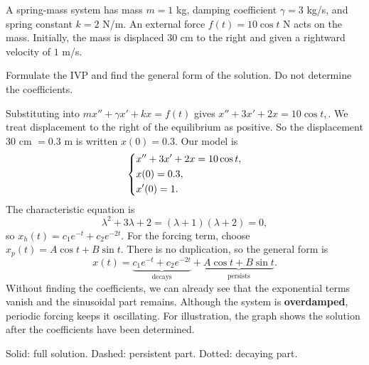 \documentclass[10pt,letterpaper]{article}
\begin{document}
\begin{example}[1]{
A spring-mass system has mass $m=1$ kg, damping coefficient
$\gamma=3$ kg/s, and spring constant $k=2$ N/m.
An external force $f(t)=10\cos t$ N acts on the mass.
Initially, the mass is displaced $30$ cm to the right
and given a rightward velocity of $1$ m/s.

Formulate the IVP and find the general form of the solution.
Do not determine the coefficients.
}
Substituting into $mx''+\gamma x'+kx=f(t)$ gives $x''+3x'+2x=10\cos t,$. We treat displacement to the right of the equilibrium as positive. So the displacement $30$ cm $= 0.3$ m is written $x(0)=0.3$. Our model is
\[
\begin{dcases}
x''+3x'+2x=10\cos t,\\
x(0)=0.3,\\
x'(0)=1.
\end{dcases}
\]
The characteristic equation is
\[
\lambda^2+3\lambda+2=(\lambda+1)(\lambda+2)=0,
\]
so $x_h(t)=c_1e^{-t}+c_2e^{-2t}$.
For the forcing term, choose
$x_p(t)=A\cos t+B\sin t$. There is no duplication,
so the general form is
\[
\boxed{
x(t)=
\underbrace{c_1e^{-t}+c_2e^{-2t}}_{\text{decays}}
+
\underbrace{A\cos t+B\sin t}_{\text{persists}}.
}
\]
Without finding the coefficients, we can already see
that the exponential terms vanish and the sinusoidal
part remains. Although the system is \textbf{overdamped},
periodic forcing keeps it oscillating. For illustration, the graph shows the solution after
the coefficients have been determined.

\begin{center}

\small
Solid: full solution.
Dashed: persistent part.
Dotted: decaying part.
\end{center}
\end{example}
\end{document}

